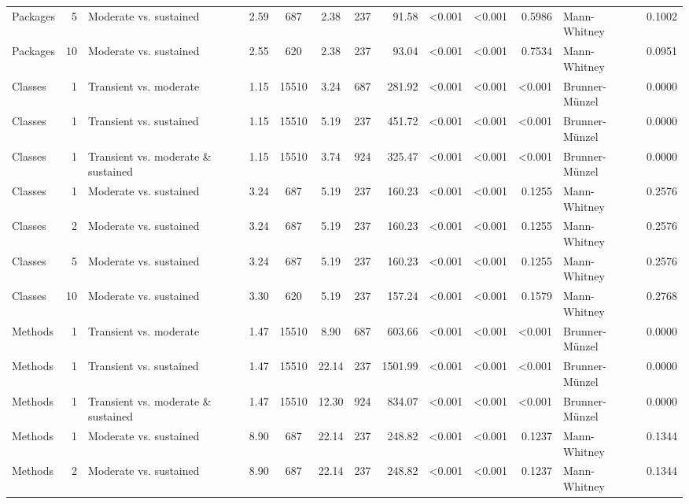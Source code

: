 \begin{table}[H]
{\begin{tabular}{l r p{4cm} c c c c r r r r l r}
Packages & 5 & Moderate vs. sustained &  2.59 & 687 & 2.38 & 237 & 91.58 & \textless 0.001 & \textless 0.001 & 0.5986 &  Mann-Whitney & 0.1002 \\ 
Packages & 10 & Moderate vs. sustained &  2.55 & 620 & 2.38 & 237 & 93.04 & \textless 0.001 & \textless 0.001 & 0.7534 &  Mann-Whitney & 0.0951 \\ 
Classes & 1 & Transient vs. moderate &  1.15 & 15510 & 3.24 & 687 & 281.92 & \textless 0.001 & \textless 0.001 & \textless 0.001 &  Brunner-Münzel & 0.0000 \\ 
Classes & 1 & Transient vs. sustained &  1.15 & 15510 & 5.19 & 237 & 451.72 & \textless 0.001 & \textless 0.001 & \textless 0.001 &  Brunner-Münzel & 0.0000 \\ 
Classes & 1 & Transient vs. moderate \& sustained &  1.15 & 15510 & 3.74 & 924 & 325.47 & \textless 0.001 & \textless 0.001 & \textless 0.001 &  Brunner-Münzel & 0.0000 \\ 
Classes & 1 & Moderate vs. sustained &  3.24 & 687 & 5.19 & 237 & 160.23 & \textless 0.001 & \textless 0.001 & 0.1255 &  Mann-Whitney & 0.2576 \\ 
Classes & 2 & Moderate vs. sustained &  3.24 & 687 & 5.19 & 237 & 160.23 & \textless 0.001 & \textless 0.001 & 0.1255 &  Mann-Whitney & 0.2576 \\ 
Classes & 5 & Moderate vs. sustained &  3.24 & 687 & 5.19 & 237 & 160.23 & \textless 0.001 & \textless 0.001 & 0.1255 &  Mann-Whitney & 0.2576 \\ 
Classes & 10 & Moderate vs. sustained &  3.30 & 620 & 5.19 & 237 & 157.24 & \textless 0.001 & \textless 0.001 & 0.1579 &  Mann-Whitney & 0.2768 \\ 
Methods & 1 & Transient vs. moderate &  1.47 & 15510 & 8.90 & 687 & 603.66 & \textless 0.001 & \textless 0.001 & \textless 0.001 &  Brunner-Münzel & 0.0000 \\ 
Methods & 1 & Transient vs. sustained &  1.47 & 15510 & 22.14 & 237 & 1501.99 & \textless 0.001 & \textless 0.001 & \textless 0.001 &  Brunner-Münzel & 0.0000 \\ 
Methods & 1 & Transient vs. moderate \& sustained &  1.47 & 15510 & 12.30 & 924 & 834.07 & \textless 0.001 & \textless 0.001 & \textless 0.001 &  Brunner-Münzel & 0.0000 \\ 
Methods & 1 & Moderate vs. sustained &  8.90 & 687 & 22.14 & 237 & 248.82 & \textless 0.001 & \textless 0.001 & 0.1237 &  Mann-Whitney & 0.1344 \\ 
Methods & 2 & Moderate vs. sustained &  8.90 & 687 & 22.14 & 237 & 248.82 & \textless 0.001 & \textless 0.001 & 0.1237 &  Mann-Whitney & 0.1344 \\ 

\end{tabular}}
\end{table}
